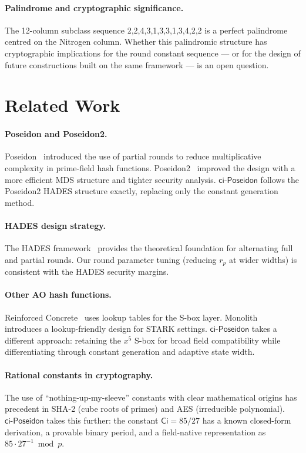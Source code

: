 \documentclass[preprint]{iacrtrans}
\newcommand{\Ci}{\ensuremath{\mathsf{Ci}}}
\newcommand{\ciposeidon}{\ensuremath{\mathsf{ci\text{-}Poseidon}}}
\begin{document}
\paragraph{Palindrome and cryptographic significance.}
The 12-column subclass sequence 2,2,4,3,1,3,3,1,3,4,2,2 is a perfect
palindrome centred on the Nitrogen column. Whether this palindromic structure
has cryptographic implications for the round constant sequence — or for the
design of future constructions built on the same framework — is an open
question.

\section{Related Work}

\paragraph{Poseidon and Poseidon2.}
Poseidon~\cite{GKR+21} introduced the use of partial rounds to reduce
multiplicative complexity in prime-field hash functions. Poseidon2~\cite{GKRRS23}
improved the design with a more efficient MDS structure and tighter security
analysis. \ciposeidon{} follows the Poseidon2 HADES structure exactly,
replacing only the constant generation method.

\paragraph{HADES design strategy.}
The HADES framework~\cite{GLRRS20} provides the theoretical foundation for
alternating full and partial rounds. Our round parameter tuning (reducing
$r_p$ at wider widths) is consistent with the HADES security margins.

\paragraph{Other AO hash functions.}
Reinforced Concrete~\cite{GLRT22} uses lookup tables for the S-box layer.
Monolith~\cite{LSSS23} introduces a lookup-friendly design for STARK
settings. \ciposeidon{} takes a different approach: retaining the $x^5$
S-box for broad field compatibility while differentiating through constant
generation and adaptive state width.

\paragraph{Rational constants in cryptography.}
The use of ``nothing-up-my-sleeve'' constants with clear mathematical origins
has precedent in SHA-2 (cube roots of primes) and AES (irreducible
polynomial). \ciposeidon{} takes this further: the constant $\Ci = 85/27$
has a known closed-form derivation, a provable binary period, and a
field-native representation as $85 \cdot 27^{-1} \bmod p$.
\end{document}
